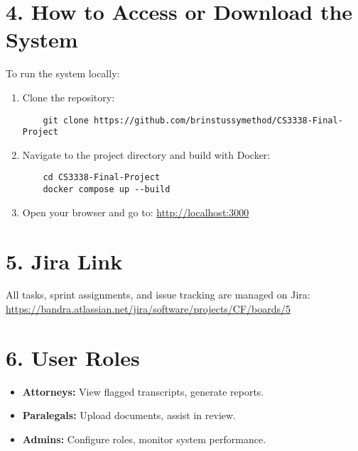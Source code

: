\documentclass[11pt]{article}
\begin{document}
\section*{4. How to Access or Download the System}
To run the system locally:
\begin{enumerate}
    \item Clone the repository:
    \begin{verbatim}
    git clone https://github.com/brinstussymethod/CS3338-Final-Project
    \end{verbatim}
    \item Navigate to the project directory and build with Docker:
    \begin{verbatim}
    cd CS3338-Final-Project
    docker compose up --build
    \end{verbatim}
    \item Open your browser and go to:
    \url{http://localhost:3000}
\end{enumerate}

\section*{5. Jira Link}
All tasks, sprint assignments, and issue tracking are managed on Jira: \\
\url{https://bandra.atlassian.net/jira/software/projects/CF/boards/5}

\section*{6. User Roles}
\begin{itemize}
    \item \textbf{Attorneys:} View flagged transcripts, generate reports.
    \item \textbf{Paralegals:} Upload documents, assist in review.
    \item \textbf{Admins:} Configure roles, monitor system performance.
\end{itemize}
\end{document}

